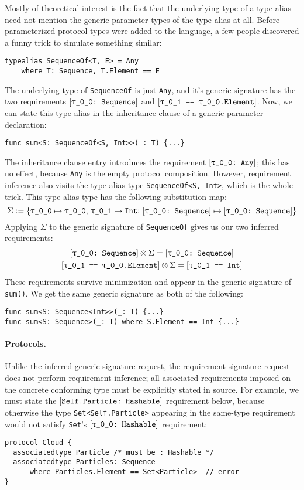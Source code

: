 \documentclass[../generics]{subfiles}
\begin{document}
Mostly of theoretical interest is the fact that the underlying type of a type alias need not mention the generic parameter types of the type alias at all. Before parameterized protocol types were added to the language, a few people discovered a funny trick to simulate something similar:
\begin{Verbatim}
typealias SequenceOf<T, E> = Any
    where T: Sequence, T.Element == E
\end{Verbatim}
The underlying type of \texttt{SequenceOf} is just \texttt{Any}, and it's generic signature has the two requirements $\ConfReq{\rT}{Sequence}$ and $\SameReq{\rU}{\rT.Element}$. Now, we can state this type alias in the inheritance clause of a generic parameter declaration:
\begin{Verbatim}
func sum<S: SequenceOf<S, Int>>(_: T) {...}
\end{Verbatim}
The inheritance clause entry introduces the requirement $\ConfReq{\rT}{Any}$; this has no effect, because \texttt{Any} is the empty protocol composition. However, requirement inference also visits the type alias type \texttt{SequenceOf<S, Int>}, which is the whole trick. This type alias type has the following substitution map:
\[
\Sigma := \SubstMapC{
\SubstType{\rT}{\rT},\,\SubstType{\rU}{Int}
}{\SubstConf{\rT}{\rT}{Sequence}}
\]
Applying $\Sigma$ to the generic signature of \texttt{SequenceOf} gives us our two inferred requirements:
\begin{gather*}
\ConfReq{\rT}{Sequence}\otimes\Sigma = \ConfReq{\rT}{Sequence}\\
\SameReq{\rU}{\rT.Element}\otimes\Sigma = \SameReq{\rU}{Int}
\end{gather*}
These requirements survive minimization and appear in the generic signature of \texttt{sum()}. We get the same generic signature as both of the following: 
\begin{Verbatim}
func sum<S: Sequence<Int>>(_: T) {...}
func sum<S: Sequence>(_: T) where S.Element == Int {...}
\end{Verbatim}

\paragraph{Protocols.}
Unlike the inferred generic signature request, the requirement signature request does not perform requirement inference; all associated requirements imposed on the concrete conforming type must be explicitly stated in source. For example, we must state the $[\texttt{Self.Particle:~Hashable}]$ requirement below, because otherwise the type \texttt{Set<Self.Particle>} appearing in the same-type requirement would not satisfy \texttt{Set}'s $\ConfReq{\rT}{Hashable}$ requirement:
\begin{Verbatim}
protocol Cloud {
  associatedtype Particle /* must be : Hashable */
  associatedtype Particles: Sequence
      where Particles.Element == Set<Particle>  // error
}
\end{Verbatim}
\end{document}
